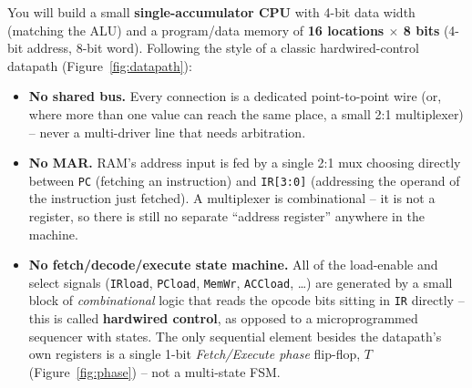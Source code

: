 \documentclass[11pt,a4paper]{article}
\begin{document}
You will build a small \textbf{single-accumulator CPU} with 4-bit data
width (matching the ALU) and a program/data memory of \textbf{16
locations $\times$ 8 bits} (4-bit address, 8-bit word). Following the
style of a classic hardwired-control datapath (Figure~\ref{fig:datapath}):

\begin{itemize}[nosep]
  \item \textbf{No shared bus.} Every connection is a dedicated
        point-to-point wire (or, where more than one value can reach the
        same place, a small 2:1 multiplexer) -- never a multi-driver line
        that needs arbitration.
  \item \textbf{No MAR.} RAM's address input is fed by a single 2:1 mux
        choosing directly between \texttt{PC} (fetching an instruction)
        and \texttt{IR[3:0]} (addressing the operand of the instruction
        just fetched). A multiplexer is combinational -- it is not a
        register, so there is still no separate ``address register''
        anywhere in the machine.
  \item \textbf{No fetch/decode/execute state machine.} All of the
        load-enable and select signals (\texttt{IRload}, \texttt{PCload},
        \texttt{MemWr}, \texttt{ACCload}, \dots) are generated by a small
        block of \emph{combinational} logic that reads the opcode bits
        sitting in \texttt{IR} directly -- this is called \textbf{hardwired
        control}, as opposed to a microprogrammed sequencer with states.
        The only sequential element besides the datapath's own registers
        is a single 1-bit \emph{Fetch/Execute phase} flip-flop, $T$
        (Figure~\ref{fig:phase}) -- not a multi-state FSM.
\end{itemize}
\end{document}
